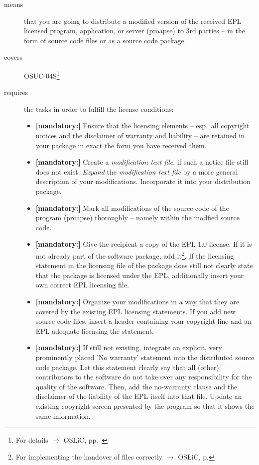 \begin{description}
\item[means] that you are going to distribute a modified version of the received
EPL licensed program, application, or server (proapse) to 3rd parties -- in the
form of source code files or as a source code package.
\item[covers] OSUC-04S\footnote{For details $\rightarrow$ OSLiC, pp.\
\pageref{OSUC-04S-DEF}}
\item[requires] the tasks in order to fulfill the license conditions:
\begin{itemize}
  
  \item \textbf{[mandatory:]} Ensure that the licensing elements -- esp.\ all
  copyright notices and the disclaimer of warranty and liability -- are retained
  in your package in exact the form you have received them.
  
  \item \textbf{[mandatory:]} Create a \emph{modification text file}, if such a
  notice file still does not exist. \emph{Expand} the \emph{modification text
  file} by a more general description of your modifications. Incorporate it into
  your distribution package.
  
  \item \textbf{[mandatory:]} Mark all modifications of the source code of the
  program (proapse) thoroughly -- namely within the
  modfied source code.
  
  \item \textbf{[mandatory:]} Give the recipient a copy of the EPL 1.0 license.
  If it is not already part of the software package, add it\footnote{For
  implementing the handover of files correctly $\rightarrow$ OSLiC, p.
  \pageref{DistributingFilesHint}}. If the licensing statement in the licensing
  file of the package does still not clearly state that the package is licensed
  under the EPL, additionally insert your own correct EPL licensing file.

  \item \textbf{[mandatory:]} Organize your modifications in a way that they are
  covered by the existing EPL licensing statements. If you add new source code
  files, insert a header containing your copyright line and an EPL adequate
  licensing the statement.
  
  \item \textbf{[mandatory:]} If still not existing, integrate an explicit, very
  prominently placed 'No warranty' statement into the distributed source code
  package. Let this statement clearly say that all (other) contributors to the
  software do not take over any responsibility for the quality of the software.
  Then, add the no-warranty clause and the disclaimer of the liability of the
  EPL itself into that file. Update an existing copyright screen presented by
  the program so that it shows the same information.


\end{itemize}
\end{description}
